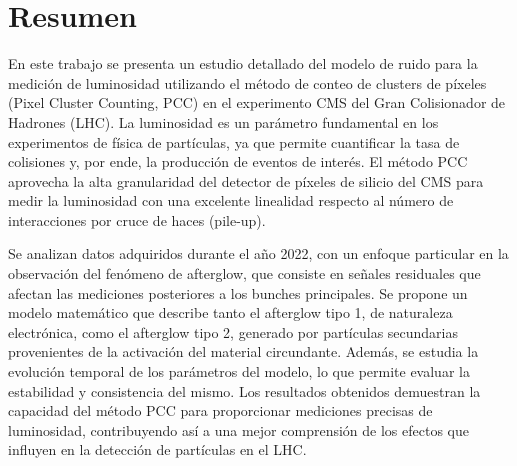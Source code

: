 \chapter{Resumen}
En este trabajo se presenta un estudio detallado del modelo de ruido para la medición de luminosidad utilizando el método de conteo de clusters de píxeles (Pixel Cluster Counting, PCC) en el experimento CMS del Gran Colisionador de Hadrones (LHC). La luminosidad es un parámetro fundamental en los experimentos de física de partículas, ya que permite cuantificar la tasa de colisiones y, por ende, la producción de eventos de interés. El método PCC aprovecha la alta granularidad del detector de píxeles de silicio del CMS para medir la luminosidad con una excelente linealidad respecto al número de interacciones por cruce de haces (pile-up). 

Se analizan datos adquiridos durante el año 2022, con un enfoque particular en la observación del fenómeno de afterglow, que consiste en señales residuales que afectan las mediciones posteriores a los bunches principales. Se propone un modelo matemático que describe tanto el afterglow tipo 1, de naturaleza electrónica, como el afterglow tipo 2, generado por partículas secundarias provenientes de la activación del material circundante. Además, se estudia la evolución temporal de los parámetros del modelo, lo que permite evaluar la estabilidad y consistencia del mismo. Los resultados obtenidos demuestran la capacidad del método PCC para proporcionar mediciones precisas de luminosidad, contribuyendo así a una mejor comprensión de los efectos que influyen en la detección de partículas en el LHC.

